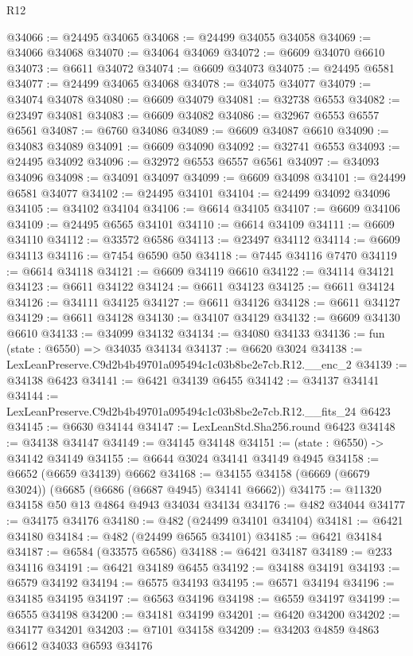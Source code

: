 \begin{lexlean}{R12}
\begin{coremodule}
@34066 := @24495 @34065
@34068 := @24499 @34055 @34058
@34069 := @34066 @34068
@34070 := @34064 @34069
@34072 := @6609 @34070 @6610
@34073 := @6611 @34072
@34074 := @6609 @34073
@34075 := @24495 @6581
@34077 := @24499 @34065 @34068
@34078 := @34075 @34077
@34079 := @34074 @34078
@34080 := @6609 @34079
@34081 := @32738 @6553
@34082 := @23497 @34081
@34083 := @6609 @34082
@34086 := @32967 @6553 @6557 @6561
@34087 := @6760 @34086
@34089 := @6609 @34087 @6610
@34090 := @34083 @34089
@34091 := @6609 @34090
@34092 := @32741 @6553
@34093 := @24495 @34092
@34096 := @32972 @6553 @6557 @6561
@34097 := @34093 @34096
@34098 := @34091 @34097
@34099 := @6609 @34098
@34101 := @24499 @6581 @34077
@34102 := @24495 @34101
@34104 := @24499 @34092 @34096
@34105 := @34102 @34104
@34106 := @6614 @34105
@34107 := @6609 @34106
@34109 := @24495 @6565 @34101
@34110 := @6614 @34109
@34111 := @6609 @34110
@34112 := @33572 @6586
@34113 := @23497 @34112
@34114 := @6609 @34113
@34116 := @7454 @6590 @50
@34118 := @7445 @34116 @7470
@34119 := @6614 @34118
@34121 := @6609 @34119 @6610
@34122 := @34114 @34121
@34123 := @6611 @34122
@34124 := @6611 @34123
@34125 := @6611 @34124
@34126 := @34111 @34125
@34127 := @6611 @34126
@34128 := @6611 @34127
@34129 := @6611 @34128
@34130 := @34107 @34129
@34132 := @6609 @34130 @6610
@34133 := @34099 @34132
@34134 := @34080 @34133
@34136 := fun (state : @6550) => @34035 @34134
@34137 := @6620 @3024
@34138 := LexLeanPreserve.C9d2b4b49701a095494c1c03b8be2e7cb.R12.__enc_2
@34139 := @34138 @6423
@34141 := @6421 @34139 @6455
@34142 := @34137 @34141
@34144 := LexLeanPreserve.C9d2b4b49701a095494c1c03b8be2e7cb.R12.__fits_24 @6423
@34145 := @6630 @34144
@34147 := LexLeanStd.Sha256.round @6423
@34148 := @34138 @34147
@34149 := @34145 @34148
@34151 := (state : @6550) -> @34142 @34149
@34155 := @6644 @3024 @34141 @34149 @4945
@34158 := @6652 (@6659 @34139) @6662
@34168 := @34155 @34158 (@6669 (@6679 @3024)) (@6685 (@6686 (@6687 @4945) @34141 @6662))
@34175 := @11320 @34158 @50 @13 @4864 @4943 @34034 @34134
@34176 := @482 @34044
@34177 := @34175 @34176
@34180 := @482 (@24499 @34101 @34104)
@34181 := @6421 @34180
@34184 := @482 (@24499 @6565 @34101)
@34185 := @6421 @34184
@34187 := @6584 (@33575 @6586)
@34188 := @6421 @34187
@34189 := @233 @34116
@34191 := @6421 @34189 @6455
@34192 := @34188 @34191
@34193 := @6579 @34192
@34194 := @6575 @34193
@34195 := @6571 @34194
@34196 := @34185 @34195
@34197 := @6563 @34196
@34198 := @6559 @34197
@34199 := @6555 @34198
@34200 := @34181 @34199
@34201 := @6420 @34200
@34202 := @34177 @34201
@34203 := @7101 @34158
@34209 := @34203 @4859 @4863 @6612 @34033 @6593 @34176

\end{coremodule}
\end{lexlean}
